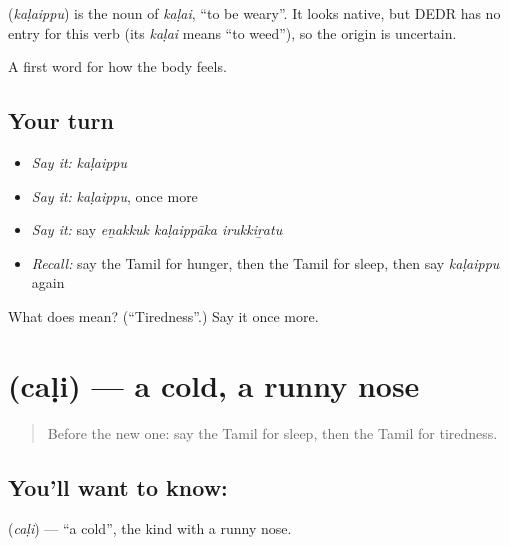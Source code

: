 \begin{cousinweb}
\textbf{} (\emph{kaḷaippu}) is the noun of \emph{kaḷai}, \textquotedblleft{}to be weary\textquotedblright{}. It looks native, but DEDR has no entry for this verb (its \emph{kaḷai} means \textquotedblleft{}to weed\textquotedblright{}), so the origin is uncertain.
\end{cousinweb}

\begin{grammarlens}[title={What you've built}]
A first word for how the body feels.
\end{grammarlens}

\subsection*{Your turn}
\begin{itemize}
\raggedright
  \item \emph{Say it:} \emph{kaḷaippu}
  \item \emph{Say it:} \emph{kaḷaippu}, once more
  \item \emph{Say it:} say \emph{eṉakkuk kaḷaippāka irukkiṟatu}
  \item \emph{Recall:} say the Tamil for hunger, then the Tamil for sleep, then say \emph{kaḷaippu} again
\end{itemize}

\begin{tcolorbox}[breakable,colback=teal!4,colframe=teal!35!black,title={Before you move on}]
What does  mean? (\textquotedblleft{}Tiredness\textquotedblright{}.) Say it once more.
\end{tcolorbox}
\section[\texorpdfstring{\ta{சளி} (caḷi)}{சளி (caḷi)}]{ (caḷi) — a cold, a runny nose}

\label{lesson:TA-C87-cold}



\begin{quote}
Before the new one: say the Tamil for sleep, then the Tamil for tiredness.
\end{quote}

\subsection*{You'll want to know: }
\textbf{} (\emph{caḷi}) — \textquotedblleft{}a cold\textquotedblright{}, the kind with a runny nose.

